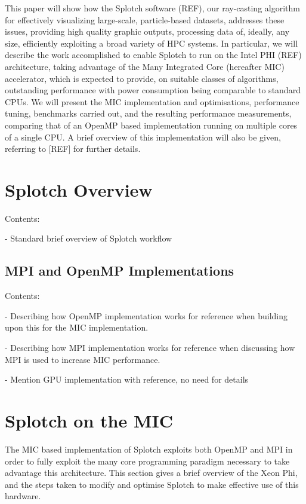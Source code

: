 \documentclass{easychair}
\begin{document}
This paper will show how the Splotch software (REF), our ray-casting algorithm for
effectively visualizing large-scale, particle-based datasets, addresses these issues, 
providing high quality graphic outputs, processing data of, ideally, any size, 
efficiently exploiting a broad variety of HPC systems. 
In particular, we will describe the work accomplished to enable Splotch to 
run on the Intel PHI (REF) architecture, taking advantage of the Many Integrated Core (hereafter MIC) accelerator,
which is expected to provide, on suitable classes of algorithms, outstanding performance 
with power consumption being comparable to standard CPUs. 
We will present the MIC implementation and optimisations, performance tuning,
benchmarks carried out, and the resulting performance measurements, comparing that of an OpenMP
based implementation running on multiple cores of a single CPU. A brief overview of this implementation
will also be given, referring to [REF] for further details.

\section{Splotch Overview}
\label{sect:overview}

\noindent
Contents:

\noindent
- Standard brief overview of Splotch workflow 


\subsection{MPI and
 OpenMP Implementations}
\label{sect:mpiopenmp}

\noindent
Contents:

\noindent
- Describing how OpenMP implementation works for reference when building upon this for the MIC implementation.

\noindent
- Describing how MPI implementation works for reference when discussing how MPI is used to increase MIC performance.

\noindent
- Mention GPU implementation with reference, no need for details

\section{Splotch on the MIC}
\label{sect:micsplotch}

The MIC based implementation of Splotch exploits both OpenMP and MPI in order to fully exploit the many core 
programming paradigm necessary to take advantage this architecture. This section gives a brief overview of the 
Xeon Phi, and the steps taken to modify and optimise Splotch to make effective use of this hardware.
\end{document}
